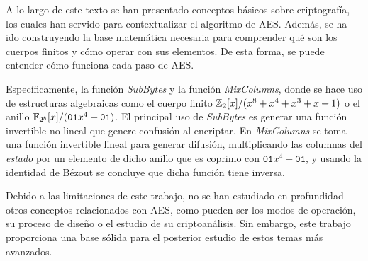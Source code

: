 A lo largo de este texto se han presentado conceptos básicos sobre criptografía, los cuales han servido para contextualizar el algoritmo de AES. Además, se ha ido construyendo la base matemática necesaria para comprender qué son los cuerpos finitos y cómo operar con sus elementos. De esta forma, se puede entender cómo funciona cada paso de AES. 

Específicamente, la función \textit{SubBytes} y la función \textit{MixColumns}, donde se hace uso de estructuras algebraicas como el cuerpo finito $\mathbb{Z}_2[x]/(x^8 + x^4 + x^3 + x + 1)$ o el anillo $\mathbb{F}_{2^8}[x]/(\texttt{01}x^4+\texttt{01})$. El principal uso de \textit{SubBytes} es generar una función invertible no lineal que genere confusión al encriptar. En \textit{MixColumns} se toma una función invertible lineal para generar difusión, multiplicando las columnas del \textit{estado} por un elemento de dicho anillo que es coprimo con $\texttt{01}x^4+\texttt{01}$, y usando la identidad de Bézout se concluye que dicha función tiene inversa.

Debido a las limitaciones de este trabajo, no se han estudiado en profundidad otros conceptos relacionados con AES, como pueden ser los modos de operación, su proceso de diseño o el estudio de su criptoanálisis. Sin embargo, este trabajo proporciona una base sólida para el posterior estudio de estos temas más avanzados.